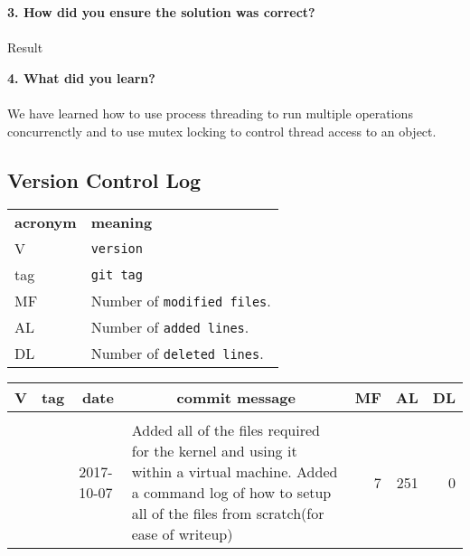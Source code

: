 \documentclass[letterpaper,10pt]{article}
\begin{document}
\textbf{3. How did you ensure the solution was correct?} \\ \\
\textnormal{Result}

\textbf{4. What did you learn?} \\ \\
\textnormal{We have learned how to use process threading to run multiple operations concurrenctly and to use mutex locking to control thread access to an object.}
\newpage
\begin{landscape}
\section{Version Control Log}

\begin{tabular}{lp{12cm}}
  \label{tabular:legend:git-log}
  \textbf{acronym} & \textbf{meaning} \\
  V & \texttt{version} \\
  tag & \texttt{git tag} \\
  MF & Number of \texttt{modified files}. \\
  AL & Number of \texttt{added lines}. \\
  DL & Number of \texttt{deleted lines}. \\
\end{tabular}

\bigskip

\begin{table}[h]
\centering
\caption{Project 1 Version Control}
\begin{longtable}{|rllp{13cm}rrr|}
\hline \multicolumn{1}{|c}{\textbf{V}} & \multicolumn{1}{c}{\textbf{tag}}
& \multicolumn{1}{c}{\textbf{date}}
& \multicolumn{1}{c}{\textbf{commit message}} & \multicolumn{1}{c}{\textbf{MF}}
& \multicolumn{1}{c}{\textbf{AL}} & \multicolumn{1}{c|}{\textbf{DL}} \\ \hline
\endhead

\hline \multicolumn{7}{|r|}{} \\ \hline
\endfoot

\hline \hline
\endlastfoot

\hline 1 &  & 2017-10-07 & {Added all of the files required for the kernel and using it within a virtual machine. Added a command log of how to setup all of the files from scratch(for ease of writeup)} & 7 & 251 & 0 \\
\hline
\end{longtable}
\end{table}
\end{landscape}
\end{document}
